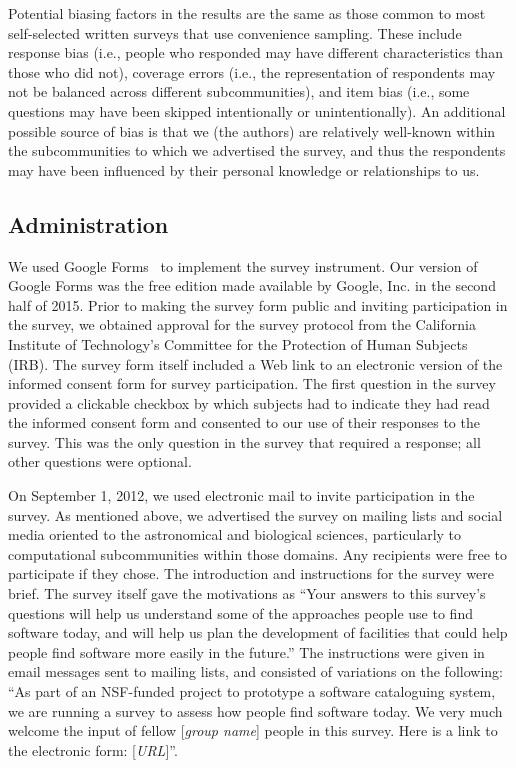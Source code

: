 \documentclass{casicswhitepaper}
\begin{document}
Potential biasing factors in the results are the same as those common to most self-selected written surveys that use convenience sampling.  These include response bias (i.e., people who responded may have different characteristics than those who did not), coverage errors (i.e., the representation of respondents may not be balanced across different subcommunities), and item bias (i.e., some questions may have been skipped intentionally or unintentionally).  An additional possible source of bias is that we (the authors) are relatively well-known within the subcommunities to which we advertised the survey, and thus the respondents may have been influenced by their personal knowledge or relationships to us.  


\subsection{Administration}

We used Google Forms~\cite{googleforms} to implement the survey instrument.  Our version of Google Forms was the free edition made available by Google, Inc. in the second half of 2015.  Prior to making the survey form public and inviting participation in the survey, we obtained approval for the survey protocol from the California Institute of Technology's Committee for the Protection of Human Subjects (IRB).  The survey form itself included a Web link to an electronic version of the informed consent form for survey participation.  The first question in the survey provided a clickable checkbox by which subjects had to indicate they had read the informed consent form and consented to our use of their responses to the survey.  This was the only question in the survey that required a response; all other questions were optional.

On September 1, 2012, we used electronic mail to invite participation in the survey.  As mentioned above, we advertised the survey on mailing lists and social media oriented to the astronomical and biological sciences, particularly to computational subcommunities within those domains.  Any recipients were free to participate if they chose.  The introduction and instructions for the survey were brief.  The survey itself gave the motivations as ``Your answers to this survey's questions will help us understand some of the approaches people use to find software today, and will help us plan the development of facilities that could help people find software more easily in the future.''  The instructions were given in email messages sent to mailing lists, and consisted of variations on the following: ``As part of an NSF-funded project to prototype a software cataloguing system, we are running a survey to assess how people find software today.  We very much welcome the input of fellow [\emph{group name}] people in this survey.  Here is a link to the electronic form: [\emph{URL}]''.
\end{document}

